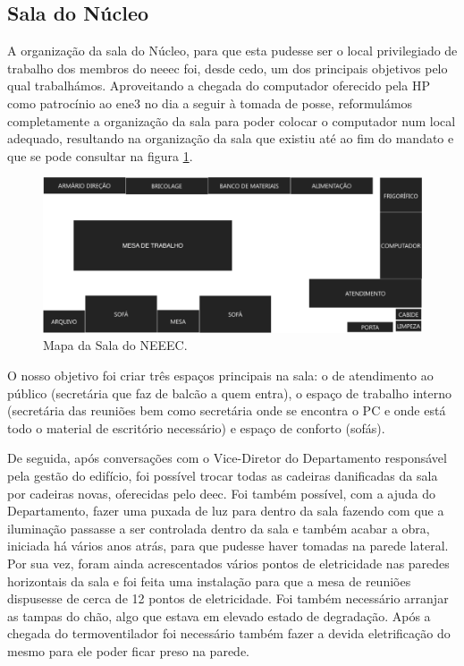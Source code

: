 
\subsection{Sala do Núcleo}

A organização da sala do Núcleo, para que esta pudesse ser o local privilegiado de trabalho dos membros do \acrshort{neeec} foi, desde cedo, um dos principais objetivos pelo qual trabalhámos. Aproveitando a chegada do computador oferecido pela HP como patrocínio ao \acrshort{ene3} no dia a seguir à tomada de posse, reformulámos completamente a organização da sala para poder colocar o computador num local adequado, resultando na organização da sala que existiu até ao fim do mandato e que se pode consultar na figura \ref{fig:salaneeec}.

\begin{figure}[ht]
\centering
\includegraphics[width=\textwidth]{imagens/salaneeec.png}
\caption{Mapa da Sala do NEEEC.}
\label{fig:salaneeec}
\end{figure}

O nosso objetivo foi criar três espaços principais na sala: o de atendimento ao público (secretária que faz de balcão a quem entra), o espaço de trabalho interno (secretária das reuniões bem como secretária onde se encontra o PC e onde está todo o material de escritório necessário) e espaço de conforto (sofás).

De seguida, após conversações com o Vice-Diretor do Departamento responsável pela gestão do edifício, foi possível trocar todas as cadeiras danificadas da sala por cadeiras novas, oferecidas pelo \acrshort{deec}. Foi também possível, com a ajuda do Departamento, fazer uma puxada de luz para dentro da sala fazendo com que a iluminação passasse a ser controlada dentro da sala e também acabar a obra, iniciada há vários anos atrás, para que pudesse haver tomadas na parede lateral. Por sua vez, foram ainda acrescentados vários pontos de eletricidade nas paredes horizontais da sala e foi feita uma instalação para que a mesa de reuniões dispusesse de cerca de 12 pontos de eletricidade. Foi também necessário arranjar as tampas do chão, algo que estava em elevado estado de degradação. Após a chegada do termoventilador foi necessário também fazer a devida eletrificação do mesmo para ele poder ficar preso na parede.

